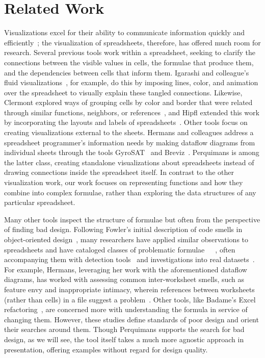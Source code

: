 \documentclass[conference]{IEEEtran}
\newcommand{\toolname}{Perquimans\xspace} \newcommand{\toolnameend}{Perquimans}
\begin{document}
	\section{Related Work} \label{related-work} Visualizations excel for their
	ability to communicate information quickly and
	efficiently~\cite{baeza1999modern}; the visualization of spreadsheets,
	therefore, has offered much room for research. Several previous tools work
	within a spreadsheet, seeking to clarify the connections between the visible
	values in cells, the formulae that produce them, and the dependencies between
	cells that inform them. Igarashi and colleague's fluid
	visualizations~\cite{igarashi1998fluid}, for example, do this by imposing
	lines, color, and animation over the spreadsheet to visually explain these
	tangled connections. Likewise, Clermont explored ways of grouping cells by
	color and border that were related through similar functions, neighbors, or
	references~\cite{clermont2003scalable}, and Hipfl extended this work by
	incorporating the layouts and labels of spreadsheets~\cite{hipfl2008using}.
	Other tools focus on creating visualizations external to the sheets. Hermans
	and colleagues address a spreadsheet programmer's information needs by making
	dataflow diagrams from individual sheets through the tools
	GyroSAT~\cite{hermans2011supporting} and Breviz~\cite{hermans2011breviz}.
	\toolname is among the latter class, creating standalone visualizations about
	spreadsheets instead of drawing connections inside the spreadsheet itself. In
	contrast to the other visualization work, our work focuses on representing
	functions and how they combine into complex formulae, rather than exploring the
	data structures of any particular spreadsheet.  \par
	
	Many other tools inspect the structure of formulae but often from the
	perspective of finding bad design.  Following Fowler's initial description of
	code smells in object-oriented design~\cite{fowler2009refactoring}, many
	researchers have applied similar observations to spreadsheets and have
	cataloged classes of problematic
	formulae~\cite{hermans2012detecting}~\cite{cunha2012towards}~\cite{asavametha2012detecting}, often accompanying them with detection tools~\cite{abreu2014smelling} and investigations into real datasets~\cite{jansen2015code}. For example, Hermans, leveraging her work with the aforementioned dataflow diagrams, has worked with assessing common inter-worksheet smells, such as feature envy and inappropriate intimacy, wherein references between worksheets (rather than cells) in a file suggest a problem~\cite{hermans2012detectinginter}. Other tools, like Badame's Excel refactoring~\cite{badame2012refactoring}, are concerned more with understanding the formula in service of changing them. However, these studies define standards of poor design and orient their searches around them. Though \toolname supports the search for bad design, as we will see, the tool itself takes a much more agnostic approach in presentation, offering examples without regard for design quality. \par
	
\end{document}
